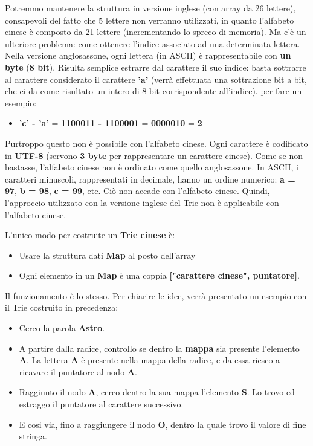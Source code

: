 \documentclass[a4paper, 12pt]{article}
\begin{document}
Potremmo mantenere la struttura in versione inglese (con array da 26 lettere), consapevoli del fatto che 5 lettere non verranno utilizzati, in quanto l'alfabeto cinese è composto da 21 lettere (incrementando lo spreco di memoria). Ma c'è un ulteriore problema: come ottenere l'indice associato ad una determinata lettera. Nella versione anglosassone, ogni lettera (in ASCII) è rappresentabile con \textbf{un byte} (\textbf{8 bit}). Risulta semplice estrarre dal carattere il suo indice: basta sottrarre al carattere considerato il carattere \textbf{'a'} (verrà effettuata una sottrazione bit a bit, che ci da come risultato un intero di 8 bit corrispondente all'indice). per fare un esempio: 
\begin{itemize}
    \item \textbf{'c' - 'a'} = \textbf{1100011 - 1100001} = \textbf{0000010} = \textbf{2} 
\end{itemize}

Purtroppo questo non è possibile con l'alfabeto cinese. Ogni carattere è codificato in \textbf{UTF-8} (servono \textbf{3 byte} per rappresentare un carattere cinese). Come se non bastasse, l'alfabeto cinese non è ordinato come quello anglosassone. In ASCII, i caratteri minuscoli, rappresentati in decimale, hanno un ordine numerico: \textbf{a = 97}, \textbf{b = 98}, \textbf{c = 99}, etc. Ciò non accade con l'alfabeto cinese. Quindi, l'approccio utilizzato con la versione inglese del Trie non è applicabile con l'alfabeto cinese.

L'unico modo per costruite un \textbf{Trie cinese} è:
\begin{itemize}
    \item Usare la struttura dati \textbf{Map} al posto dell'array
    \item Ogni elemento in un \textbf{Map} è una coppia \textbf{["carattere cinese", puntatore]}.
\end{itemize}

Il funzionamento è lo stesso. Per chiarire le idee, verrà presentato un esempio con il Trie costruito in precedenza:
\begin{itemize}
    \item Cerco la parola \textbf{Astro}.
    \item A partire dalla radice, controllo se dentro la \textbf{mappa} sia presente l'elemento \textbf{A}. La lettera \textbf{A} è presente nella mappa della radice, e da essa riesco a ricavare il puntatore al nodo \textbf{A}. 
    \item Raggiunto il nodo \textbf{A}, cerco dentro la sua mappa l'elemento \textbf{S}. Lo trovo ed estraggo il puntatore al carattere successivo.
    \item E cosi via, fino a raggiungere il nodo \textbf{O}, dentro la quale trovo il valore di fine stringa.
\end{itemize}
\end{document}
